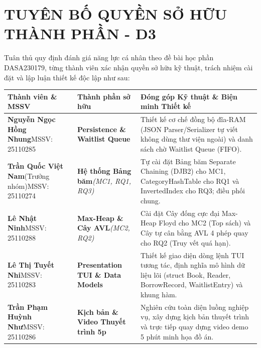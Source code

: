 \documentclass[14pt,a4paper]{extarticle}
\begin{document}
\newpage
\thispagestyle{empty}
\begingroup
\titlespacing*{\section}{0pt}{0pt}{4pt}
\section*{TUYÊN BỐ QUYỀN SỞ HỮU THÀNH PHẦN - D3}

\vspace{-0.25cm}
\noindent
Tuân thủ quy định đánh giá năng lực cá nhân theo đề bài học phần DASA230179, từng thành viên xác nhận quyền sở hữu kỹ thuật, trách nhiệm cài đặt và lập luận thiết kế độc lập như sau:

\vspace{0.15cm}
\noindent
\begingroup
{}
\setlength{\tabcolsep}{3pt}
\renewcommand{\arraystretch}{0.95}
\begin{tabularx}{\linewidth}{|>{\raggedright\arraybackslash}m{3.1cm}|>{\raggedright\arraybackslash}m{2.8cm}|>{\raggedright\arraybackslash}X|}
\hline
\textbf{Thành viên \& MSSV} & \textbf{Thành phần sở hữu} & \textbf{Đóng góp Kỹ thuật \& Biện minh Thiết kế} \\ \hline
\textbf{Nguyễn Ngọc Hồng Nhung}\newline MSSV: 25110285 & \textbf{Persistence \& Waitlist Queue} & Thiết kế cơ chế đồng bộ đĩa-RAM (JSON Parser/Serializer tự viết không dùng thư viện ngoài) và danh sách chờ Waitlist Queue (FIFO). \\ \hline
\textbf{Trần Quốc Việt Nam}\newline (Trưởng nhóm)\newline MSSV: 25110274 & \textbf{Hệ thống Bảng băm}\newline \textit{(MC1, RQ1, RQ3)} & Tự cài đặt Bảng băm Separate Chaining (DJB2) cho MC1, CategoryHashTable cho RQ1 và InvertedIndex cho RQ3; điều phối chung. \\ \hline
\textbf{Lê Nhật Ninh}\newline MSSV: 25110288 & \textbf{Max-Heap \& Cây AVL}\newline \textit{(MC2, RQ2)} & Cài đặt Cây đống cực đại Max-Heap Floyd cho MC2 (Top sách) và Cây tự cân bằng AVL 4 phép quay cho RQ2 (Truy vết quá hạn). \\ \hline
\textbf{Lê Thị Tuyết Nhi}\newline MSSV: 25110283 & \textbf{Presentation TUI \& Data Models} & Thiết kế giao diện dòng lệnh TUI tương tác, định nghĩa mô hình dữ liệu lõi (struct Book, Reader, BorrowRecord, WaitlistEntry) và khung hàm. \\ \hline
\textbf{Trần Phạm Huỳnh Như}\newline MSSV: 25110286 & \textbf{Kịch bản \& Video Thuyết trình 5p} & Nghiên cứu toàn diện luồng nghiệp vụ, xây dựng kịch bản thuyết trình và trực tiếp quay dựng video demo 5 phút minh họa đồ án. \\ \hline
\end{tabularx}
\endgroup
\end{document}

